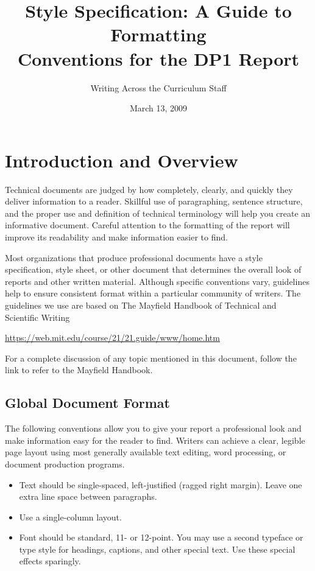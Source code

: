 \documentclass[strict]{6033dp1}
\title{Style Specification: A Guide to Formatting \\
  Conventions for the DP1 Report}
\author{Writing Across the Curriculum Staff}
\date{March 13, 2009}
\begin{document}
\maketitle

\section{Introduction and Overview}
Technical documents are judged by how completely, clearly, and quickly
they deliver information to a reader.  Skillful use of paragraphing,
sentence structure, and the proper use and definition of technical
terminology will help you create an informative document.  Careful
attention to the formatting of the report will improve its readability
and make information easier to find.

Most organizations that produce professional documents have a style
specification, style sheet, or other document that determines the
overall look of reports and other written material.  Although specific
conventions vary, guidelines help to ensure consistent format within a
particular community of writers.  The guidelines we use are based on
The Mayfield Handbook of Technical and Scientific Writing

\url{https://web.mit.edu/course/21/21.guide/www/home.htm}

For a complete discussion of any topic mentioned in this document,
follow the link to refer to the Mayfield Handbook.

\subsection{Global Document Format}
The following conventions allow you to give your report a professional
look and make information easy for the reader to find.  Writers can
achieve a clear, legible page layout using most generally available
text editing, word processing, or document production programs.

\begin{itemize}
\item Text should be single-spaced, left-justified (ragged right
  margin).  Leave one extra line space between paragraphs.
\item Use a single-column layout.
\item Font should be standard, 11- or 12-point.  You may use a second
  typeface or type style for headings, captions, and other special
  text.  Use these special effects sparingly.
\end{itemize}
\end{document}
